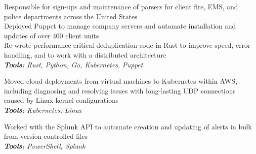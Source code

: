 \documentclass[10pt,letter]{altacv}
\begin{document}

\begin{fullwidth}
\marginpar{\makesidebarheader}
    \vspace*{-1\baselineskip}
\makecvheader
\end{fullwidth}


Responsible for sign-ups and maintenance of parsers for client fire, EMS, and police departments across the United States \\
Deployed Puppet to manage company servers and automate installation and updates of over 400 client units \\
Re-wrote performance-critical deduplication code in Rust to improve speed, error handling, and to work with a distributed architecture \\
\textit{\textbf{Tools:} Rust, Python, Go, Kubernetes, Puppet}

\divider

Moved cloud deployments from virtual machines to Kubernetes within AWS, including diagnosing and resolving issues with long-lasting UDP connections caused by Linux kernel configurations \\
\textit{\textbf{Tools:} Kubernetes, Linux}

\divider

Worked with the Splunk API to automate creation and updating of alerts in bulk from version-controlled files \\
\textit{\textbf{Tools:} PowerShell, Splunk}
\end{document}

